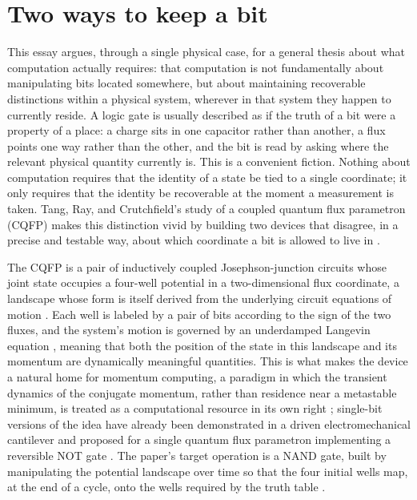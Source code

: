 \documentclass[11pt]{article}
\begin{document}
\section{Two ways to keep a bit}

This essay argues, through a single physical case, for a general thesis about what computation actually requires: that computation is not fundamentally about manipulating bits located somewhere, but about maintaining recoverable distinctions within a physical system, wherever in that system they happen to currently reside. A logic gate is usually described as if the truth of a bit were a property of a place: a charge sits in one capacitor rather than another, a flux points one way rather than the other, and the bit is read by asking where the relevant physical quantity currently is. This is a convenient fiction. Nothing about computation requires that the identity of a state be tied to a single coordinate; it only requires that the identity be recoverable at the moment a measurement is taken. Tang, Ray, and Crutchfield's study of a coupled quantum flux parametron (CQFP) makes this distinction vivid by building two devices that disagree, in a precise and testable way, about which coordinate a bit is allowed to live in \cite{TangRayCrutchfield2026,RayBoydWimsattCrutchfield2021}.

The CQFP is a pair of inductively coupled Josephson-junction circuits whose joint state occupies a four-well potential in a two-dimensional flux coordinate, a landscape whose form is itself derived from the underlying circuit equations of motion \cite{TangRayCrutchfield2025}. Each well is labeled by a pair of bits according to the sign of the two fluxes, and the system's motion is governed by an underdamped Langevin equation \cite{KalmykovCoffey2012}, meaning that both the position of the state in this landscape and its momentum are dynamically meaningful quantities. This is what makes the device a natural home for momentum computing, a paradigm in which the transient dynamics of the conjugate momentum, rather than residence near a metastable minimum, is treated as a computational resource in its own right \cite{RayBoydWimsattCrutchfield2021}; single-bit versions of the idea have already been demonstrated in a driven electromechanical cantilever \cite{DagoBellon2023} and proposed for a single quantum flux parametron implementing a reversible NOT gate \cite{RayCrutchfield2023}. The paper's target operation is a NAND gate, built by manipulating the potential landscape over time so that the four initial wells map, at the end of a cycle, onto the wells required by the truth table \cite{LewisPapadimitriou1998}.
\end{document}
